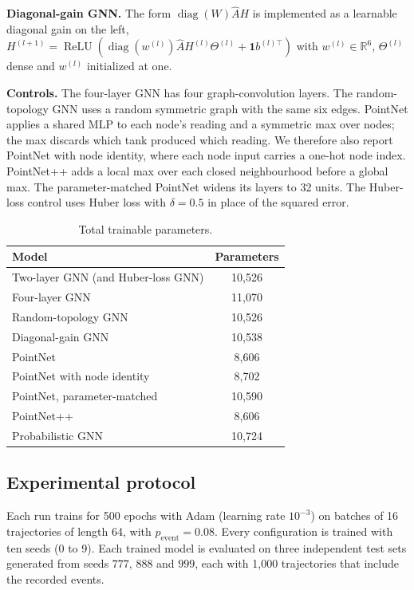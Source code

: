\documentclass[conference]{IEEEtran}
\begin{document}
\textbf{Diagonal-gain GNN.} The form $\operatorname{diag}(W)\hat AH$ is implemented as a learnable diagonal gain on the left, $H^{(l+1)}=\operatorname{ReLU}(\operatorname{diag}(w^{(l)})\hat AH^{(l)}\Theta^{(l)}+\mathbf 1 b^{(l)\top})$ with $w^{(l)}\in\mathbb{R}^6$, $\Theta^{(l)}$ dense and $w^{(l)}$ initialized at one.

\textbf{Controls.} The four-layer GNN has four graph-convolution layers. The random-topology GNN uses a random symmetric graph with the same six edges. PointNet applies a shared MLP to each node's reading and a symmetric max over nodes; the max discards which tank produced which reading. We therefore also report PointNet with node identity, where each node input carries a one-hot node index. PointNet++ adds a local max over each closed neighbourhood before a global max. The parameter-matched PointNet widens its layers to 32 units. The Huber-loss control uses Huber loss with $\delta=0.5$ in place of the squared error.

\begin{table}[t]
\centering
\caption{Total trainable parameters.}
\label{tab:params_count}
\small
\begin{tabular}{lc}
\toprule
Model & Parameters \\
\midrule
Two-layer GNN (and Huber-loss GNN) & 10{,}526 \\
Four-layer GNN & 11{,}070 \\
Random-topology GNN & 10{,}526 \\
Diagonal-gain GNN & 10{,}538 \\
PointNet & 8{,}606 \\
PointNet with node identity & 8{,}702 \\
PointNet, parameter-matched & 10{,}590 \\
PointNet++ & 8{,}606 \\
Probabilistic GNN & 10{,}724 \\
\bottomrule
\end{tabular}
\end{table}

\subsection{Experimental protocol}
\label{sec:protocol}

Each run trains for 500 epochs with Adam (learning rate $10^{-3}$) on batches of 16 trajectories of length 64, with $p_{\text{event}}=0.08$. Every configuration is trained with ten seeds (0 to 9). Each trained model is evaluated on three independent test sets generated from seeds $777$, $888$ and $999$, each with 1{,}000 trajectories that include the recorded events.
\end{document}
